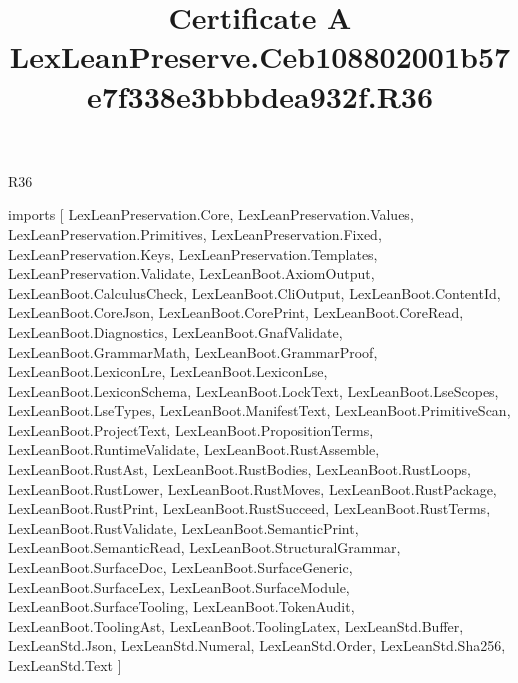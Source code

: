 \begin{lexlean}{R36}
\title{Certificate A LexLeanPreserve.Ceb108802001b57e7f338e3bbbdea932f.R36}
\begin{coremodule}
imports [
  LexLeanPreservation.Core,
  LexLeanPreservation.Values,
  LexLeanPreservation.Primitives,
  LexLeanPreservation.Fixed,
  LexLeanPreservation.Keys,
  LexLeanPreservation.Templates,
  LexLeanPreservation.Validate,
  LexLeanBoot.AxiomOutput,
  LexLeanBoot.CalculusCheck,
  LexLeanBoot.CliOutput,
  LexLeanBoot.ContentId,
  LexLeanBoot.CoreJson,
  LexLeanBoot.CorePrint,
  LexLeanBoot.CoreRead,
  LexLeanBoot.Diagnostics,
  LexLeanBoot.GnafValidate,
  LexLeanBoot.GrammarMath,
  LexLeanBoot.GrammarProof,
  LexLeanBoot.LexiconLre,
  LexLeanBoot.LexiconLse,
  LexLeanBoot.LexiconSchema,
  LexLeanBoot.LockText,
  LexLeanBoot.LseScopes,
  LexLeanBoot.LseTypes,
  LexLeanBoot.ManifestText,
  LexLeanBoot.PrimitiveScan,
  LexLeanBoot.ProjectText,
  LexLeanBoot.PropositionTerms,
  LexLeanBoot.RuntimeValidate,
  LexLeanBoot.RustAssemble,
  LexLeanBoot.RustAst,
  LexLeanBoot.RustBodies,
  LexLeanBoot.RustLoops,
  LexLeanBoot.RustLower,
  LexLeanBoot.RustMoves,
  LexLeanBoot.RustPackage,
  LexLeanBoot.RustPrint,
  LexLeanBoot.RustSucceed,
  LexLeanBoot.RustTerms,
  LexLeanBoot.RustValidate,
  LexLeanBoot.SemanticPrint,
  LexLeanBoot.SemanticRead,
  LexLeanBoot.StructuralGrammar,
  LexLeanBoot.SurfaceDoc,
  LexLeanBoot.SurfaceGeneric,
  LexLeanBoot.SurfaceLex,
  LexLeanBoot.SurfaceModule,
  LexLeanBoot.SurfaceTooling,
  LexLeanBoot.TokenAudit,
  LexLeanBoot.ToolingAst,
  LexLeanBoot.ToolingLatex,
  LexLeanStd.Buffer,
  LexLeanStd.Json,
  LexLeanStd.Numeral,
  LexLeanStd.Order,
  LexLeanStd.Sha256,
  LexLeanStd.Text
]


\end{coremodule}
\end{lexlean}
